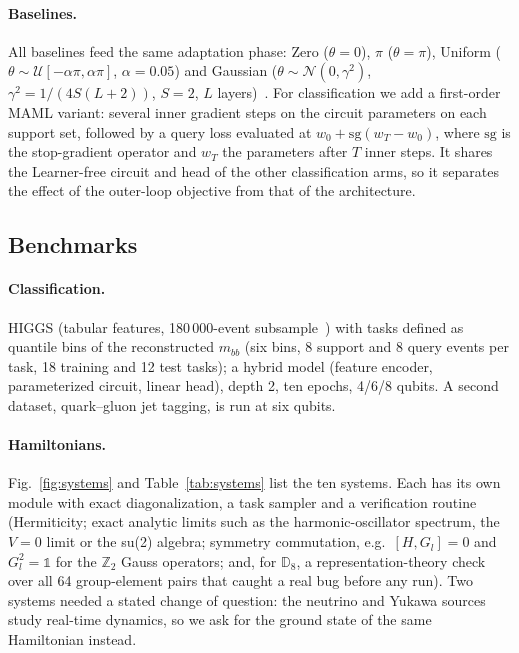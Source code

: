 \paragraph{Baselines.} All baselines feed the same adaptation phase: Zero ($\theta=0$), $\pi$ ($\theta=\pi$), Uniform ($\theta\sim\mathcal{U}[-\alpha\pi,\alpha\pi]$, $\alpha=0.05$) and Gaussian ($\theta\sim\mathcal{N}(0,\gamma^2)$, $\gamma^2=1/(4S(L{+}2))$, $S=2$, $L$ layers)~\cite{zhang2022escaping}. For classification we add a first-order MAML variant: several inner gradient steps on the circuit parameters on each support set, followed by a query loss evaluated at $w_0+\mathrm{sg}(w_T-w_0)$, where $\mathrm{sg}$ is the stop-gradient operator and $w_T$ the parameters after $T$ inner steps. It shares the Learner-free circuit and head of the other classification arms, so it separates the effect of the outer-loop objective from that of the architecture.

\subsection{Benchmarks}\label{sec:bench}

\paragraph{Classification.} HIGGS (tabular features, 180\,000-event subsample~\cite{baldi2014higgs}) with tasks defined as quantile bins of the reconstructed $m_{bb}$ (six bins, 8 support and 8 query events per task, 18 training and 12 test tasks); a hybrid model (feature encoder, parameterized circuit, linear head), depth 2, ten epochs, 4/6/8 qubits. A second dataset, quark--gluon jet tagging, is run at six qubits.

\paragraph{Hamiltonians.} Fig.~\ref{fig:systems} and Table~\ref{tab:systems} list the ten systems. Each has its own module with exact diagonalization, a task sampler and a verification routine (Hermiticity; exact analytic limits such as the harmonic-oscillator spectrum, the $V{=}0$ limit or the su(2) algebra; symmetry commutation, e.g.\ $[H,G_l]=0$ and $G_l^2=\mathbb{1}$ for the $\mathbb{Z}_2$ Gauss operators; and, for $\mathbb{D}_8$, a representation-theory check over all 64 group-element pairs that caught a real bug before any run). Two systems needed a stated change of question: the neutrino and Yukawa sources study real-time dynamics, so we ask for the ground state of the same Hamiltonian instead.

